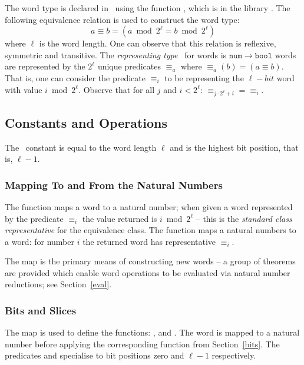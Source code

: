 The word type is declared in \HOL\ using the function , which is in the library .  The following equivalence relation is used to construct the word type:
\[ a \equiv b = (a \bmod 2^\ell = b \bmod 2^\ell) \]
where $\ell$ is the word length.
One can observe that this relation is reflexive, symmetric and transitive.
The \emph{representing type}~\cite{gordon-melham-hol} for words is $\mathtt{num}\rightarrow\mathtt{bool}$ \ie{} words are represented by the $2^\ell$ unique predicates ${\equiv_a}$ where ${\equiv_a}(b) = (a \equiv b)$.  That is, one can consider the predicate ${\equiv_i}$ to be representing the $\ell-bit$ word with value $i \bmod 2^\ell$.  Observe that for all $j$ and $i < 2^\ell$: ${\equiv_{j\cdot 2^\ell + i}} = {\equiv_i}$.

\subsection{Constants and Operations} \label{ops}

The \HOL\ constant  is equal to the word length $\ell$ and  is the highest bit position, that is, $\ell - 1$.

\subsubsection{Mapping To and From the Natural Numbers}

The function  maps a word to a natural number; when given a word represented by the predicate ${\equiv_i}$ the value returned is $i \bmod 2^\ell$ -- this is the \emph{standard class representative} for the equivalence class.  The function  maps a natural numbers to a word: for number $i$ the returned word has representative ${\equiv_i}$.

The map  is the primary means of constructing new words -- a group of theorems are provided which enable word operations to be evaluated via natural number reductions; see Section~\ref{eval}.

\subsubsection{Bits and Slices}

The map  is used to define the functions: ,  and .
The word is mapped to a natural number before applying the corresponding function from Section~\ref{bits}.
The predicates  and  specialise  to bit positions zero and $\ell - 1$ respectively.

